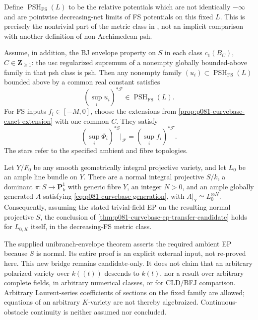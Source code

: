 Define \(\operatorname{PSH}_{\mathrm{FS}}(L)\) to be the relative
potentials which are not identically \(-\infty\) and are pointwise
decreasing-net limits of FS potentials on this fixed \(L\).
This is precisely the nontrivial part of the metric class in
\cite[Definition~7.2]{BE2021}, not an implicit comparison with another
definition of non-Archimedean psh.

\begin{theorem}\label{thm:p081-curvebase-ep-transfer-candidate}
Assume, in addition, the BJ envelope property on \(S\) in each class
\(c_1(B_C)\), \(C\in\mathbf Z_{\geq1}\): the usc regularized supremum
of a nonempty globally bounded-above family in that psh class is psh.
Then any nonempty family \((u_i)\subset
\operatorname{PSH}_{\mathrm{FS}}(L)\) bounded above by a common real
constant satisfies
\[
                (\sup_i u_i)^{*\mathcal F}
                        \in\operatorname{PSH}_{\mathrm{FS}}(L).
\]
For FS inputs \(f_i\in[-M,0]\), choose the extensions from
\cref{prop:p081-curvebase-exact-extension} with one common \(C\).
They satisfy
\begin{equation}\label{eq:p081-curvebase-usc}
       (\sup_i\Phi_i)^{*S}|_{\mathcal F}
                       =(\sup_i f_i)^{*\mathcal F}.
\end{equation}
The stars refer to the specified ambient and fibre topologies.
\end{theorem}

\begin{proposition}\label{prop:p081-curvebase-arrange}
Let \(Y/F_0\) be any smooth geometrically integral projective variety,
and let \(L_0\) be an ample line bundle on \(Y\).
There are a normal integral projective \(S/k\), a dominant
\(\pi:S\to\mathbf P^1_k\) with generic fibre \(Y\), an integer \(N>0\),
and an ample globally generated \(A\) satisfying
\eqref{eq:p081-curvebase-generation}, with \(A|_Y\simeq L_0^{\otimes N}\).
Consequently, assuming the stated trivial-field EP on the resulting
normal projective \(S\), the conclusion of
\cref{thm:p081-curvebase-ep-transfer-candidate} holds for \(L_{0,K}\)
itself, in the decreasing-FS metric class.
\end{proposition}

The supplied unibranch-envelope theorem asserts the required ambient EP
because \(S\) is normal. Its entire proof is an explicit external input,
not re-proved here. This new bridge remains candidate-only. It does not
claim that an arbitrary polarized variety over \(k((t))\) descends to
\(k(t)\), nor a result over arbitrary complete fields, in arbitrary
numerical classes, or for CLD/BFJ comparison. Arbitrary Laurent-series
coefficients of sections on the fixed family are allowed; equations of
an arbitrary \(K\)-variety are not thereby algebraized.
Continuous-obstacle continuity is neither assumed nor concluded.
